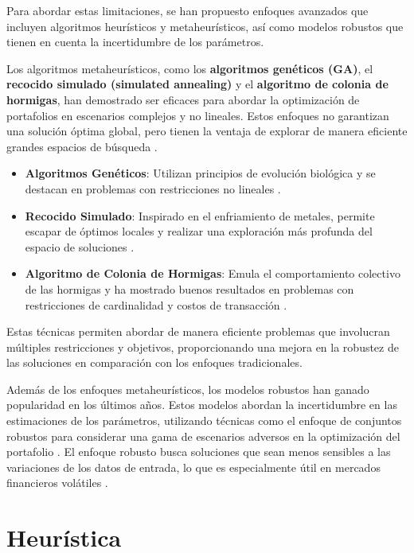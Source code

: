 \documentclass[9pt,a4paper,twoside]{rho-class/rho}
\begin{document}
            \noindent Para abordar estas limitaciones, se han propuesto enfoques avanzados que incluyen algoritmos heurísticos y metaheurísticos, así como modelos robustos que tienen en cuenta la incertidumbre de los parámetros.

            Los algoritmos metaheurísticos, como los \textbf{algoritmos genéticos (GA)}, el \textbf{recocido simulado (simulated annealing)} y el \textbf{algoritmo de colonia de hormigas}, han demostrado ser eficaces para abordar la optimización de portafolios en escenarios complejos y no lineales. Estos enfoques no garantizan una solución óptima global, pero tienen la ventaja de explorar de manera eficiente grandes espacios de búsqueda \cite{Dorigo2004, Kirkpatrick1983}.
            \begin{itemize}
                \item \textbf{Algoritmos Genéticos}: Utilizan principios de evolución biológica y se destacan en problemas con restricciones no lineales \cite{Deb2001}.
                \item \textbf{Recocido Simulado}: Inspirado en el enfriamiento de metales, permite escapar de óptimos locales y realizar una exploración más profunda del espacio de soluciones \cite{Kirkpatrick1983}.
                \item \textbf{Algoritmo de Colonia de Hormigas}: Emula el comportamiento colectivo de las hormigas y ha mostrado buenos resultados en problemas con restricciones de cardinalidad y costos de transacción \cite{Dorigo2004}.
            \end{itemize}

            \noindent Estas técnicas permiten abordar de manera eficiente problemas que involucran múltiples restricciones y objetivos, proporcionando una mejora en la robustez de las soluciones en comparación con los enfoques tradicionales.

            \vspace{2mm}\noindent Además de los enfoques metaheurísticos, los modelos robustos han ganado popularidad en los últimos años. Estos modelos abordan la incertidumbre en las estimaciones de los parámetros, utilizando técnicas como el enfoque de conjuntos robustos para considerar una gama de escenarios adversos en la optimización del portafolio .
            El enfoque robusto busca soluciones que sean menos sensibles a las variaciones de los datos de entrada, lo que es especialmente útil en mercados financieros volátiles \cite{BenTal2009}.

    \section{Heurística}
\end{document}
